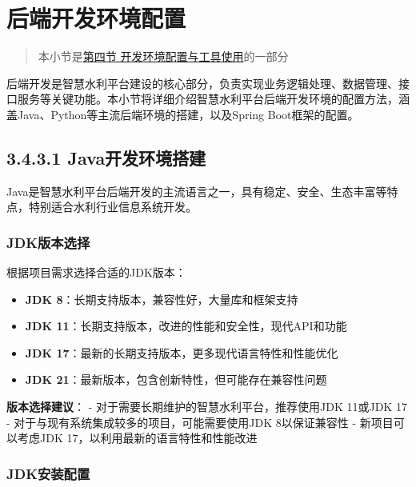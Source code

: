 \section{后端开发环境配置}\label{ux540eux7aefux5f00ux53d1ux73afux5883ux914dux7f6e}

\begin{quote}
本小节是\href{section03-04.md}{第四节 开发环境配置与工具使用}的一部分
\end{quote}

后端开发是智慧水利平台建设的核心部分，负责实现业务逻辑处理、数据管理、接口服务等关键功能。本小节将详细介绍智慧水利平台后端开发环境的配置方法，涵盖Java、Python等主流后端环境的搭建，以及Spring
Boot框架的配置。

\subsection{3.4.3.1
Java开发环境搭建}\label{javaux5f00ux53d1ux73afux5883ux642dux5efa}

Java是智慧水利平台后端开发的主流语言之一，具有稳定、安全、生态丰富等特点，特别适合水利行业信息系统开发。

\subsubsection{JDK版本选择}\label{jdkux7248ux672cux9009ux62e9}

根据项目需求选择合适的JDK版本：

\begin{itemize}
\tightlist
\item
  \textbf{JDK 8}：长期支持版本，兼容性好，大量库和框架支持
\item
  \textbf{JDK 11}：长期支持版本，改进的性能和安全性，现代API和功能
\item
  \textbf{JDK 17}：最新的长期支持版本，更多现代语言特性和性能优化
\item
  \textbf{JDK 21}：最新版本，包含创新特性，但可能存在兼容性问题
\end{itemize}

\textbf{版本选择建议}： - 对于需要长期维护的智慧水利平台，推荐使用JDK
11或JDK 17 - 对于与现有系统集成较多的项目，可能需要使用JDK 8以保证兼容性
- 新项目可以考虑JDK 17，以利用最新的语言特性和性能改进

\subsubsection{JDK安装配置}\label{jdkux5b89ux88c5ux914dux7f6e}

